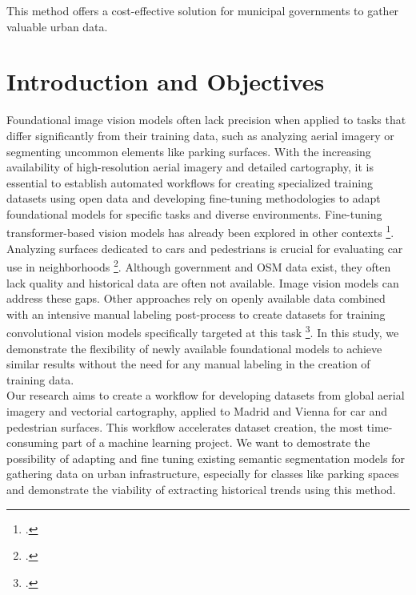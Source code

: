 \begin{refsection}
This method offers a cost-effective solution for municipal governments to gather valuable urban data.

\renewcommand{\sectionnametext}{Introduction and Objectives}
\renewcommand{\headingtextR}{\thesection. \sectionnametext}
\section{\sectionnametext}

Foundational image vision models often lack precision when applied to tasks that differ significantly from their training data, such as analyzing aerial imagery or segmenting uncommon elements like parking surfaces. With the increasing availability of high-resolution aerial imagery and detailed cartography, it is essential to establish automated workflows for creating specialized training datasets using open data and developing fine-tuning methodologies to adapt foundational models for specific tasks and diverse environments. Fine-tuning transformer-based vision models has already been explored in other contexts \footcite{sandler_fine-tuning_2022}.\\ 


Analyzing surfaces dedicated to cars and pedestrians is crucial for evaluating car use in neighborhoods \footcite{nurul_habib_integrating_2012}. Although government and OSM data exist, they often lack quality and historical data are often not available. Image vision models can address these gaps. Other approaches rely on openly available data combined with an intensive manual labeling post-process to create datasets for training convolutional vision models specifically targeted at this task \footcite{henry_citywide_2021, hellekes_parking_2023}. In this study, we demonstrate the flexibility of newly available foundational models to achieve similar results without the need for any manual labeling in the creation of training data. \\ 


Our research aims to create a workflow for developing datasets from global aerial imagery and vectorial cartography, applied to Madrid and Vienna for car and pedestrian surfaces. This workflow accelerates dataset creation, the most time-consuming part of a machine learning project. We want to demostrate the possibility of adapting and fine tuning existing semantic segmentation models for gathering data on urban infrastructure, especially for classes like parking spaces and demonstrate the viability of extracting historical trends using this method. 


\end{refsection}
